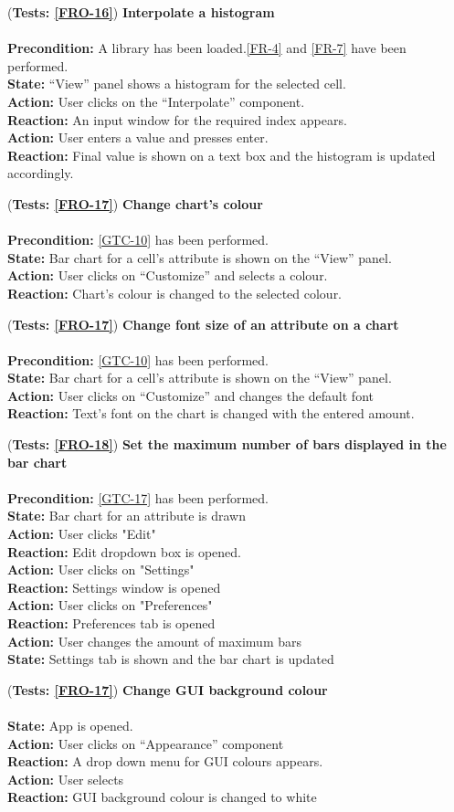 \documentclass[10pt,a4paper]{report}
\newcommand{\precondition}[1]{
    \textbf{Precondition: } #1 \leavevmode \\
}
\newcommand{\action}[1]{
    \textbf{Action: } #1 \leavevmode \\
}
\newcommand{\state}[1]{
    \textbf{State: } #1 \leavevmode \\
}
\newcommand{\reaction}[1]{
    \textbf{Reaction: } #1 \leavevmode \\
}
\newcommand{\GTCODescription}[2]{
    (\textbf{Tests: #1}) \textbf{#2} \leavevmode \\
}
\begin{document}
\begin{GTCO}
    \item \GTCODescription{\ref{FRO-16}}
    {Interpolate a histogram} \leavevmode \\ 
        \precondition{A library has been loaded.\ref{FR-4} and \ref{FR-7} have been performed.}
        \state{“View” panel shows a histogram for the selected cell.}
        \action{User clicks on the “Interpolate” component.}
        \reaction{An input window for the required index appears.}
        \action{User enters a value and presses enter.}
        \reaction{Final value is shown on a text box and the histogram is updated accordingly.}\label{GTCO-17}
    
    \item \GTCODescription{\ref{FRO-17}}
    {Change chart’s colour} \leavevmode \\ 
        \precondition{\ref{GTC-10} has been performed.}
        \state{Bar chart for a cell's attribute is shown on the “View” panel.}
        \action{User clicks on “Customize” and selects a colour.}
        \reaction{Chart’s colour is changed to the selected colour.}\label{GTCO-18}
    
    \item \GTCODescription{\ref{FRO-17}}
    {Change font size of an attribute on a chart} \leavevmode \\ 
        \precondition{\ref{GTC-10} has been performed.}
        \state{Bar chart for a cell's attribute is shown on the “View” panel.}
        \action{User clicks on “Customize” and changes the default font }
        \reaction{Text’s font on the chart is changed with the entered amount.}\label{GTCO-19}
    
    \item \GTCODescription{\ref{FRO-18}}
    {Set the maximum number of bars displayed in the bar chart} \leavevmode \\ 
        \precondition{\ref{GTC-17} has been performed.}
        \state{Bar chart for an attribute is drawn}
        \action{User clicks "Edit"}
        \reaction{Edit dropdown box is opened.}
        \action{User clicks on "Settings"}
        \reaction{Settings window is opened}
        \action{User clicks on "Preferences"} 
        \reaction{Preferences tab is opened}
        \action{User changes the amount of maximum bars}
        \state{Settings tab is shown and the bar chart is updated}\label{GTCO-20}
    
    
    \item \GTCODescription{\ref{FRO-17}}
    {Change GUI background colour} \leavevmode \\ 
        \state{App is opened.}
        \action{User clicks on “Appearance” component}
        \reaction{A drop down menu for GUI colours appears.}
        \action{User selects}
        \reaction{GUI background colour is changed to white}\label{GTCO-21}
    

\end{GTCO}
\end{document}

